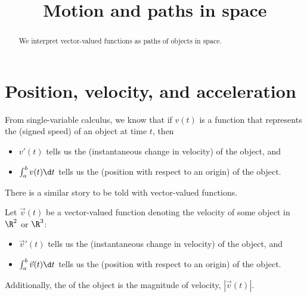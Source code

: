 \documentclass{ximera}
\title[Dig-In:]{Motion and paths in space}
\begin{document}
\begin{abstract}
  We interpret vector-valued functions as paths of objects in space.
\end{abstract}
\maketitle

\section{Position, velocity, and acceleration}

From single-variable calculus, we know that if $v(t)$ is a function that
represents the  (signed speed) of an object at time $t$,
then
\begin{itemize}
\item $v'(t)$ tells us the  (instantaneous change in
  velocity) of the object, and
\item $\int_a^b v(t) \d t$ tells us the  (position
  with respect to an origin) of the object.
\end{itemize}

There is a similar story to be told with vector-valued functions.

\begin{definition}
Let $\vec{v}(t)$ be a vector-valued function denoting the velocity of
some object in $\R^2$ or $\R^3$:
\begin{itemize}
\item $\vec{v}'(t)$ tells us the  (instantaneous
  change in velocity) of the object, and 
\item $\int_a^b \vec{v}(t) \d t$ tells us the  (position
  with respect to an origin) of the object.
\end{itemize}
Additionally, the  of the object is the magnitude of
velocity, $|\vec v(t)|$.
\end{definition}
\end{document}
